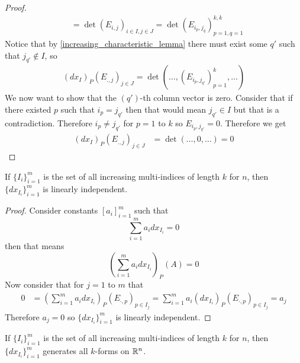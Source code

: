 \documentclass[notes]{subfiles}
\begin{document}
\begin{proof}
\begin{align*}
        &= \det(E_{i, j})_{i \in I, j \in J}
        = \det(E_{i_p, j_q})_{p = 1, q = 1}^{k, k}
    \end{align*}
    Notice that by \cref{increasing_characteristic_lemma} there must exist some $q'$ such that $j_{q'} \notin I$, so
    \begin{align*}
        (dx_I)_P(E_{., j})_{j \in J}
        = \det(\ldots, (E_{i_p, j_{q'}})_{p = 1}^k, \ldots)
    \end{align*}
    We now want to show that the $(q')$-th column vector is zero. Consider that if there existed $p$ such that $i_p = j_{q'}$ then that would mean $j_{q'} \in I$ but that is a contradiction. Therefore $i_p \neq j_{q'}$ for $p = 1$ to $k$ so $E_{i_p, j_{q'}} = 0$. Therefore we get
    \begin{align*}
        (dx_I)_P(E_{., j})_{j \in J}
        &= \det(\ldots, 0, \ldots)
        = 0
    \end{align*}
\end{proof}

\begin{lemma}
    If $\{I_i\}_{i = 1}^m$ is the set of all increasing multi-indices of length $k$ for $n$, then $\{dx_{I_i}\}_{i = 1}^m$ is linearly independent.
\end{lemma}
\begin{proof}
    Consider constants $[a_i]_{i = 1}^m$ such that
    \[
        \sum_{i = 1}^m a_i dx_{I_i} = 0
    \]
    then that means
    \[
        \left(\sum_{i = 1}^m a_i dx_{I_i}\right)_P(A) = 0
    \]
    Now consider that for $j = 1$ to $m$ that
    \begin{align*}
        0
        &= \left(\sum_{i = 1}^m a_i dx_{I_i}\right)_P(E_{\cdot, p})_{p \in I_j} = \sum_{i = 1}^m a_i(dx_{I_i})_P(E_{\cdot, p})_{p \in I_j}
        = a_j
    \end{align*}
    Therefore $a_j =  0$ so $\{dx_{I_i}\}_{i = 1}^m$ is linearly independent.
\end{proof}

\begin{theorem}
    If $\{I_i\}_{i = 1}^m$ is the set of all increasing multi-indices of length $k$ for $n$, then $\{dx_{I_i}\}_{i = 1}^m$ generates all $k$-forms on $\mathbb{R}^n$.
\end{theorem}
\end{document}
